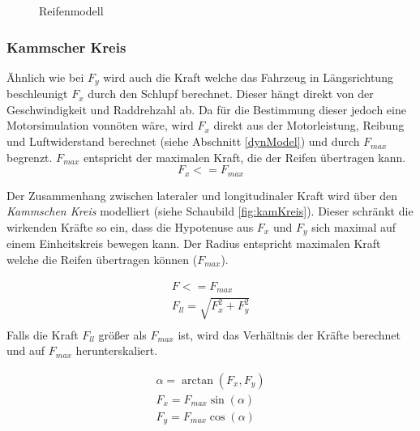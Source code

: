 \documentclass{like}
\begin{document}
\begin{figure}[ht!]
	\centering
	 
	\caption{Reifenmodell}
	\label{fig:pacejka}
\end{figure}

\subsubsection*{Kammscher Kreis}

Ähnlich wie bei \(F_y\) wird auch die Kraft welche das Fahrzeug in Längsrichtung beschleunigt \(F_x\) durch den Schlupf berechnet. Dieser hängt direkt von der Geschwindigkeit und Raddrehzahl ab. 
Da für die Bestimmung dieser jedoch eine Motorsimulation vonnöten wäre, wird \(F_x\) direkt aus der Motorleistung, Reibung und Luftwiderstand berechnet (siehe Abschnitt \ref{dynModel}) und durch \(F_{max}\) begrenzt. \(F_{max}\) entspricht der maximalen Kraft, die der Reifen übertragen kann.\\
\begin{equation}
F_x <= F_{max}
\end{equation}

Der Zusammenhang zwischen lateraler und longitudinaler Kraft wird über den \textit{Kammschen Kreis} modelliert (siehe Schaubild \ref{fig:kamKreis}). Dieser schränkt die wirkenden Kräfte so ein, dass die Hypotenuse aus \(F_x\) und \(F_y\) sich maximal auf einem Einheitskreis bewegen kann. Der Radius entspricht maximalen Kraft welche die Reifen übertragen können (\(F_{max}\)).

\begin{eqnarray}
F <= F_{max} \\
F_{ll} = \sqrt{F_x^2 + F_y^2}  \\
\end{eqnarray}
Falls die Kraft $F_{ll}$ größer als $F_{max}$ ist, wird das Verhältnis der Kräfte berechnet und auf $F_{max}$ herunterskaliert.

\begin{eqnarray}
\alpha = \arctan(F_x, F_y)\\
F_x = F_{max} \sin(\alpha)\\
F_y = F_{max} \cos(\alpha)\\ 
\end{eqnarray}
\end{document}
